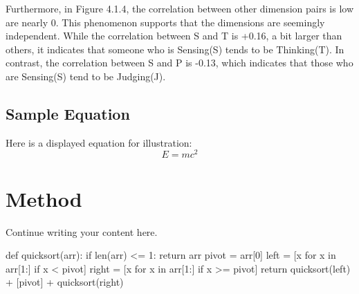 \documentclass[12pt]{article}
\begin{document}
	Furthermore, in Figure 4.1.4, the correlation between other dimension pairs is low are nearly 0. This phenomenon supports that the dimensions are seemingly independent. While the correlation between S and T is +0.16, a bit larger than others, it indicates that someone who is Sensing(S) tends to be Thinking(T). In contrast, the correlation between S and P is -0.13, which indicates that those who are Sensing(S) tend to be Judging(J).
	
	\subsection{Sample Equation}
	Here is a displayed equation for illustration:
	\[
	E = mc^{2}
	\]
	
	\section{Method}
	Continue writing your content here.
	\begin{python}
def quicksort(arr):
if len(arr) <= 1:
return arr
pivot = arr[0]
left = [x for x in arr[1:] if x < pivot]
right = [x for x in arr[1:] if x >= pivot]
return quicksort(left) + [pivot] + quicksort(right)
	\end{python}
	
	



\printbibliography[title={References}]
\end{document}
